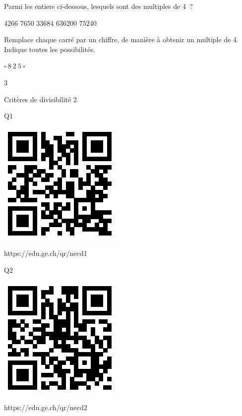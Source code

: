 \documentclass[a4paper,11pt]{report}
\begin{document}
\begin{exo}{ 
    \begin{tasks}
    \task Parmi les entiers ci-dessous, lesquels sont des multiples de 4~?
        \begin{center}
            $4266$ \hspace*{1.3cm} $7650$ \hspace*{1.3cm} $33684$ \hspace*{1.3cm} $636200$ \hspace*{1.3cm} $75240$
        \end{center}
            
	\vspace{-0.2cm}      

\task Remplace chaque carré par un chiffre, de manière à obtenir un multiple de 4. Indique toutes les possibilités. 
\end{tasks}
\begin{center}
{\large $\square~8~2~5~\square$}
\end{center}
}{3}\end{exo}

	\begin{qmoodle}{Critères de divisibilité
}{2}{
	\begin{center}	
		Q1

\includegraphics[scale=1]{media/qr/necd1 }

\tiny{{https://edu.ge.ch/qr/necd1}}
\end{center}
	\begin{center}	
		Q2

\includegraphics[scale=1]{media/qr/necd2 }

\tiny{{https://edu.ge.ch/qr/necd2}}
\end{center}
}
\end{qmoodle}
\end{document}

